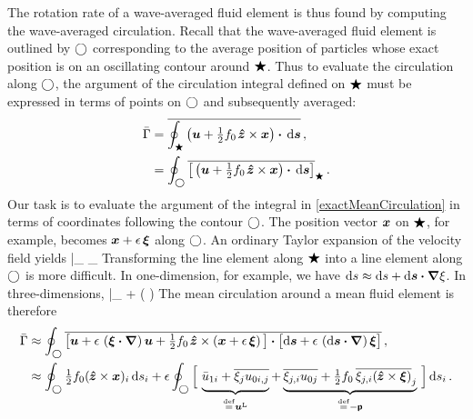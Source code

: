 \documentclass[12pt, oneside]{book}
\begin{document}
The rotation rate of a wave-averaged fluid element is thus found by computing the wave-averaged circulation.  
Recall that the wave-averaged fluid element is outlined by $\bigcirc$ corresponding to the average position of particles whose exact position is on an oscillating contour around $\bigstar$.  Thus to evaluate the circulation along $\bigcirc$, the argument of the circulation integral defined on $\bigstar$ must be expressed in terms of points on $\bigcirc$ and subsequently averaged:
\begin{align}
\bar \Gamma &= \overline{ \oint_{\bigstar} \left ( \boldsymbol u + \tfrac{1}{2} f_0 \hspace{0.1em}\boldsymbol{\hat z} \times \boldsymbol x \right ) \boldsymbol \cdot {\, \rm d} \boldsymbol{s} } \, , \\
&= \oint_{\bigcirc} \overline{ \big [ \left ( \boldsymbol u + \tfrac{1}{2} f_0 \hspace{0.1em}\boldsymbol{\hat z} \times \boldsymbol x \right ) \boldsymbol \cdot {\, \rm d} \boldsymbol{s} \big ] }_{\bigstar} \, . \label{exactMeanCirculation}
\end{align}
Our task is to evaluate the argument of the integral in \eqref{exactMeanCirculation} in terms of coordinates following the contour $\bigcirc$.  The position vector $\boldsymbol x$ on $\bigstar$, for example, becomes $\boldsymbol x + \epsilon \, \boldsymbol {\xi}$ along $\bigcirc$.  An ordinary Taylor expansion of the velocity field yields
\beq
\bu \; \big |_{\wavyc} \; \approx \; \big [ \bu + \ep \left ( \bxi \bcdot \bnabla \right ) \bu \, \big ]_{\meanc} \per 
\eeq
Transforming the line element along $\bigstar$ into a line element along $\bigcirc$ is more difficult.  In one-dimension, for example, we have ${\rm d} s \approx {\rm d} s + {\rm d} \boldsymbol{s} \boldsymbol \cdot \boldsymbol \nabla \xi$.  In three-dimensions,
\beq
\dd \bs \; \big |_{\wavyc} \approx \dd \bs + \ep \left ( \dd \bs \bcdot \bnabla \right ) \bxi \per
\eeq
The mean circulation around a mean fluid element is therefore
\begin{align}
\bar \Gamma &\approx \oint_{\meanc} \overline{ \big [ \bu + \ep \, \left ( \bxi \bcdot \bnabla \right ) \bu + \half f_0 \bzh \times \left ( \bx + \ep \, \bxi \right ) \big ] \bcdot \big [ \dd \bs + \ep \, \left ( \dd \bs \bcdot \bnabla \right ) \bxi \big ] } \com \\
&\approx  \oint_{\meanc} \half f_0 ( \! \bzh \times \bx)_i \id s_i + \ep \oint_{\meanc} \Big [ \, \underbrace{\mystrut{1.2ex} \avu_{1i} + \overline{\xi_j u_{0i,j}}}_{\defn \buL} 
+ \underbrace{ \mystrut{1.2ex} \overline{\xi_{j,i} u_{0j} } + \half f_0 \, \overline{\xi_{j,i} ( \! \bzh \times \bxi )}_j }_{\defn - \sbp} \, \Big ] 
\id s_i \per \label{definitionOfPseudomomentum}
\end{align}
\end{document}
